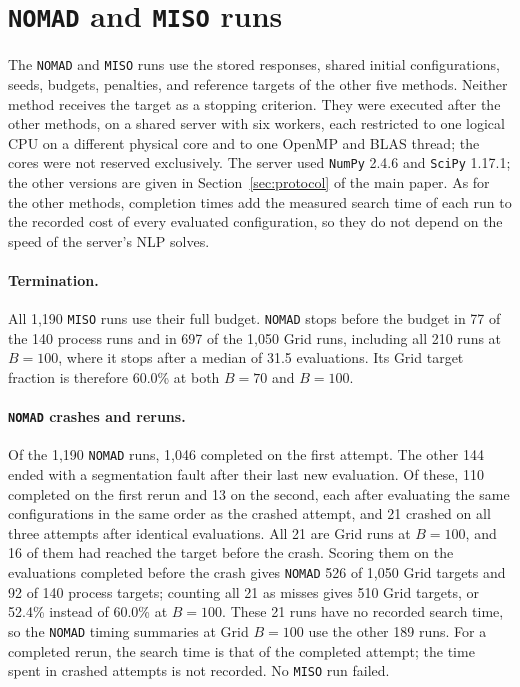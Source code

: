 \section{\texttt{NOMAD} and \texttt{MISO} runs}\label{sec:supp-nomad-miso}
The \texttt{NOMAD} and \texttt{MISO} runs use the stored responses, shared initial configurations, seeds, budgets, penalties, and reference targets of the other five methods.
Neither method receives the target as a stopping criterion.
They were executed after the other methods, on a shared server with six workers, each restricted to one logical CPU on a different physical core and to one OpenMP and BLAS thread; the cores were not reserved exclusively.
The server used \texttt{NumPy} 2.4.6 and \texttt{SciPy} 1.17.1; the other versions are given in Section~\ifdefined\manuscriptwithsupplement\ref{sec:protocol}\fi{} of the main paper.
As for the other methods, completion times add the measured search time of each run to the recorded cost of every evaluated configuration, so they do not depend on the speed of the server's NLP solves.

\paragraph{Termination.}
All 1,190 \texttt{MISO} runs use their full budget.
\texttt{NOMAD} stops before the budget in 77 of the 140 process runs and in 697 of the 1,050 Grid runs, including all 210 runs at \(B=100\), where it stops after a median of 31.5 evaluations.
Its Grid target fraction is therefore 60.0\% at both \(B=70\) and \(B=100\).

\paragraph{\texttt{NOMAD} crashes and reruns.}
Of the 1,190 \texttt{NOMAD} runs, 1,046 completed on the first attempt.
The other 144 ended with a segmentation fault after their last new evaluation.
Of these, 110 completed on the first rerun and 13 on the second, each after evaluating the same configurations in the same order as the crashed attempt, and 21 crashed on all three attempts after identical evaluations.
All 21 are Grid runs at \(B=100\), and 16 of them had reached the target before the crash.
Scoring them on the evaluations completed before the crash gives \texttt{NOMAD} 526 of 1,050 Grid targets and 92 of 140 process targets; counting all 21 as misses gives 510 Grid targets, or 52.4\% instead of 60.0\% at \(B=100\).
These 21 runs have no recorded search time, so the \texttt{NOMAD} timing summaries at Grid \(B=100\) use the other 189 runs.
For a completed rerun, the search time is that of the completed attempt; the time spent in crashed attempts is not recorded.
No \texttt{MISO} run failed.

